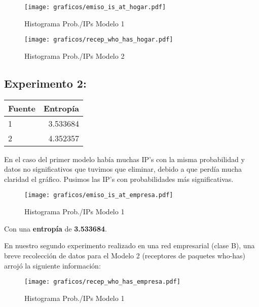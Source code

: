 \begin{figure}[H]
	\centering
	\texttt{[image: graficos/emiso\_is\_at\_hogar.pdf]}
	\caption{Histograma Prob./IPs Modelo 1}
	\label{histogramaprobabilidadesModel1}
\end{figure}


\begin{figure}[H]
	\centering
	\texttt{[image: graficos/recep\_who\_has\_hogar.pdf]}
	\caption{Histograma Prob./IPs Modelo 2}
	\label{histogramaprobabilidadesModel2}
\end{figure}

\newpage
\subsection{Experimento 2:}

\begin{center}
\begin{tabular}{ l r }
   Fuente& Entropía  \\
\hline
   1 & 3.533684 \\
   2 & 4.352357 \\
 \end{tabular}
\label{entropiasexperimento2}
\end{center}

En el caso del primer modelo había muchas IP's con la misma probabilidad y datos no significativos que tuvimos que eliminar,
debido a que perdía mucha claridad el gráfico. Pusimos las IP's con probabilidades más significativas.

\begin{figure}[H]
	\centering
	\texttt{[image: graficos/emiso\_is\_at\_empresa.pdf]}
	\caption{Histograma Prob./IPs Modelo 1}
	\label{histogramaprobabilidadesModel1}
\end{figure}

Con una \textbf{entropía} de \textbf{3.533684}.


En nuestro segundo experimento realizado en una red empresarial (clase B), una breve recolección de datos para el Modelo 2 (receptores de paquetes who-has) arrojó la siguiente información:

\begin{figure}[H]
	\centering
	\texttt{[image: graficos/recep\_who\_has\_empresa.pdf]}
	\caption{Histograma Prob./IPs Modelo 1}
	\label{histogramaprobabilidadesatos}
\end{figure}

